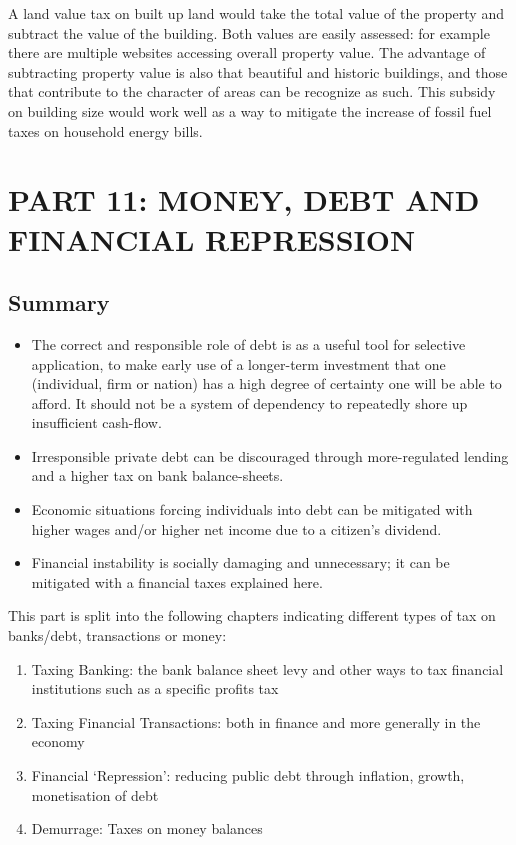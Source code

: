 \documentclass[]{tufte-handout}
\providecommand{\tightlist}{%
  \setlength{\itemsep}{0pt}\setlength{\parskip}{0pt}}
\begin{document}
A land value tax on built up land would take the total value of the
property and subtract the value of the building. Both values are easily
assessed: for example there are multiple websites accessing overall
property value. The advantage of subtracting property value is also that
beautiful and historic buildings, and those that contribute to the
character of areas can be recognize as such. This subsidy on building
size would work well as a way to mitigate the increase of fossil fuel
taxes on household energy bills.

\newpage

\hypertarget{part-11-money-debt-and-financial-repression}{%
\section{PART 11: MONEY, DEBT AND FINANCIAL
REPRESSION}\label{part-11-money-debt-and-financial-repression}}

\hypertarget{summary-5}{%
\subsection{Summary}\label{summary-5}}

\begin{itemize}
\tightlist
\item
  The correct and responsible role of debt is as a useful tool for
  selective application, to make early use of a longer-term investment
  that one (individual, firm or nation) has a high degree of certainty
  one will be able to afford. It should not be a system of dependency to
  repeatedly shore up insufficient cash-flow.
\item
  Irresponsible private debt can be discouraged through more-regulated
  lending and a higher tax on bank balance-sheets.
\item
  Economic situations forcing individuals into debt can be mitigated
  with higher wages and/or higher net income due to a citizen's
  dividend.
\item
  Financial instability is socially damaging and unnecessary; it can be
  mitigated with a financial taxes explained here.
\end{itemize}

This part is split into the following chapters indicating different
types of tax on banks/debt, transactions or money:

\begin{enumerate}
\def\labelenumi{\arabic{enumi}.}
\tightlist
\item
  Taxing Banking: the bank balance sheet levy and other ways to tax
  financial institutions such as a specific profits tax
\item
  Taxing Financial Transactions: both in finance and more generally in
  the economy
\item
  Financial `Repression': reducing public debt through inflation,
  growth, monetisation of debt
\item
  Demurrage: Taxes on money balances
\end{enumerate}
\end{document}
